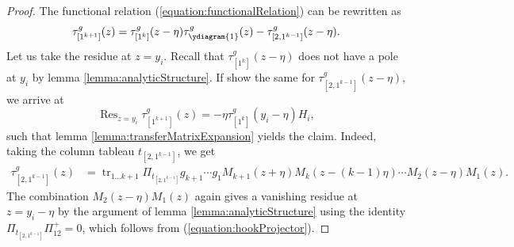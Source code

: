 \documentclass[11pt]{report}
\theoremstyle{definition}
\theoremstyle{remark}
\theoremstyle{remark}
\begin{document}
\begin{proof}
The functional relation (\ref{equation:functionalRelation}) can be rewritten as
\begin{equation*}
\tau_{[1^{k+1}]}^g(z) = \tau_{[1^k]}^g(z-\eta) \tau_{\ydiagram{1}}^g(z) - \tau_{[2,1^{k-1}]}^g(z-\eta).
\end{equation*}
Let us take the residue at $z=y_i$. Recall that $\tau_{[1^k]}^g(z-\eta)$ does not have a pole at $y_i$ by lemma \ref{lemma:analyticStructure}. If show the same for $\tau_{[2,1^{k-1}]}^g(z-\eta)$, we arrive at
\begin{equation*}
\operatorname{Res}_{z=y_i} \tau_{[1^{k+1}]}^g(z)
= -\eta \tau_{[1^k]}^g(y_i-\eta) H_i,
\end{equation*}
such that lemma \ref{lemma:transferMatrixExpansion} yields the claim.
Indeed, taking the column tableau $t_{[2,1^{k-1}]}$, we get
\begin{align*}
\tau_{[2,1^{k-1}]}^g(z)
&= \operatorname{tr}_{1...k+1} \Pi_{t_{[2,1^{k-1}]}} g_{k+1} \cdots g_1 M_{k+1}(z+\eta) M_k(z-(k-1)\eta) \cdots M_2(z-\eta) M_1(z).
\end{align*}
The combination $M_2(z-\eta) M_1(z)$ again gives a vanishing residue at $z=y_i-\eta$ by the argument of lemma \ref{lemma:analyticStructure} using the identity $\Pi_{t_{[2,1^{k-1}]}} \Pi_{12}^+ = 0$, which follows from (\ref{equation:hookProjector}).
\end{proof}
\end{document}
